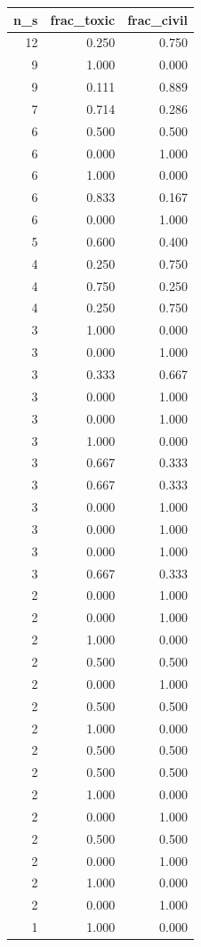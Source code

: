 \begin{tabular}{rrr}
\toprule
n_s & frac_toxic & frac_civil \\
\midrule
12 & 0.250 & 0.750 \\
9 & 1.000 & 0.000 \\
9 & 0.111 & 0.889 \\
7 & 0.714 & 0.286 \\
6 & 0.500 & 0.500 \\
6 & 0.000 & 1.000 \\
6 & 1.000 & 0.000 \\
6 & 0.833 & 0.167 \\
6 & 0.000 & 1.000 \\
5 & 0.600 & 0.400 \\
4 & 0.250 & 0.750 \\
4 & 0.750 & 0.250 \\
4 & 0.250 & 0.750 \\
3 & 1.000 & 0.000 \\
3 & 0.000 & 1.000 \\
3 & 0.333 & 0.667 \\
3 & 0.000 & 1.000 \\
3 & 0.000 & 1.000 \\
3 & 1.000 & 0.000 \\
3 & 0.667 & 0.333 \\
3 & 0.667 & 0.333 \\
3 & 0.000 & 1.000 \\
3 & 0.000 & 1.000 \\
3 & 0.000 & 1.000 \\
3 & 0.667 & 0.333 \\
2 & 0.000 & 1.000 \\
2 & 0.000 & 1.000 \\
2 & 1.000 & 0.000 \\
2 & 0.500 & 0.500 \\
2 & 0.000 & 1.000 \\
2 & 0.500 & 0.500 \\
2 & 1.000 & 0.000 \\
2 & 0.500 & 0.500 \\
2 & 0.500 & 0.500 \\
2 & 1.000 & 0.000 \\
2 & 0.000 & 1.000 \\
2 & 0.500 & 0.500 \\
2 & 0.000 & 1.000 \\
2 & 1.000 & 0.000 \\
2 & 0.000 & 1.000 \\
1 & 1.000 & 0.000 \\

\end{tabular}
